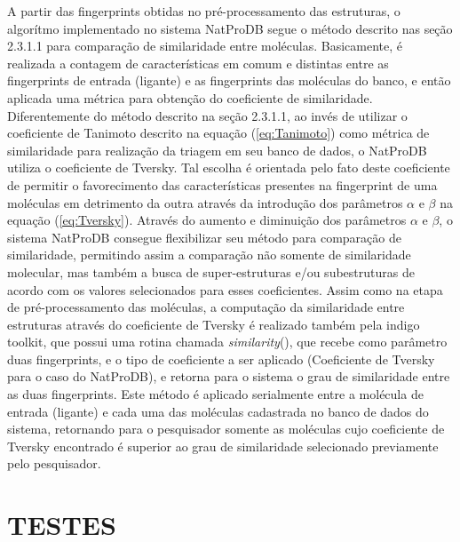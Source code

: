 A partir das fingerprints obtidas no pré-processamento das estruturas, o algorítmo implementado no sistema NatProDB segue o método descrito nas seção 2.3.1.1 para comparação de similaridade entre moléculas. Basicamente, é realizada a contagem de características em comum e distintas entre as fingerprints de entrada (ligante) e as fingerprints das moléculas do banco, e então aplicada uma métrica para obtenção do coeficiente de similaridade. Diferentemente do método descrito na seção 2.3.1.1, ao invés de utilizar o coeficiente de Tanimoto  descrito na equação (\ref{eq:Tanimoto}) como métrica de similaridade para realização da triagem em seu banco de dados, o NatProDB utiliza o coeficiente de Tversky. Tal escolha é orientada pelo fato deste coeficiente de permitir o favorecimento das características presentes na fingerprint de uma moléculas em detrimento da outra através da introdução dos parâmetros $\alpha$ e $\beta$ na equação (\ref{eq:Tversky}). Através do aumento e diminuição dos parâmetros $\alpha$ e $\beta$, o sistema NatProDB consegue flexibilizar seu método para comparação de similaridade, permitindo assim a comparação não somente de similaridade molecular, mas também a busca de super-estruturas e/ou subestruturas de acordo com os valores selecionados para esses coeficientes. Assim como na etapa de pré-processamento das moléculas, a computação da similaridade entre estruturas através do coeficiente de Tversky é realizado também pela indigo toolkit, que possui uma rotina chamada \textit{similarity}(), que recebe como parâmetro duas fingerprints, e o tipo de coeficiente a ser aplicado (Coeficiente de Tversky para o caso do NatProDB), e retorna para o sistema o grau de similaridade entre as duas fingerprints. Este método é aplicado serialmente entre a molécula de entrada (ligante) e cada uma das moléculas cadastrada no banco de dados do sistema, retornando para o pesquisador somente as moléculas cujo coeficiente de Tversky encontrado é superior ao grau de similaridade selecionado previamente pelo pesquisador.  

\section{TESTES}

